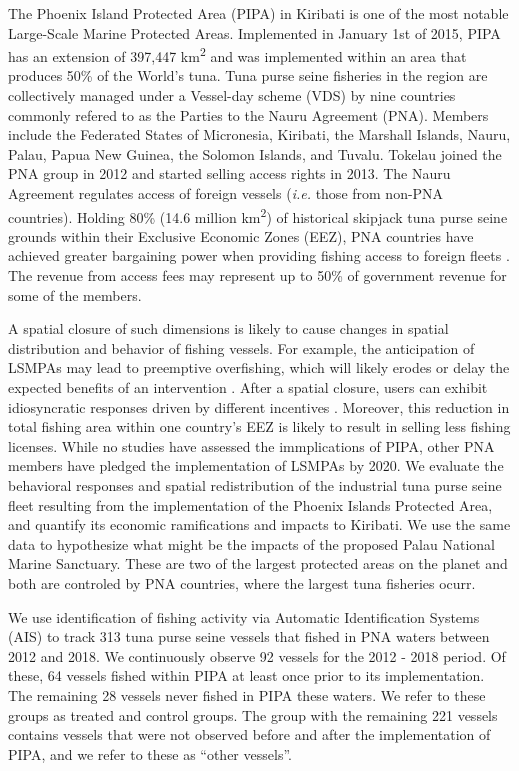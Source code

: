 \documentclass[9p,twocolumn,twoside,lineno]{pnas-new}
\begin{document}
The Phoenix Island Protected Area (PIPA) in Kiribati is one of the most notable Large-Scale Marine Protected Areas. Implemented in January 1st of 2015, PIPA has an extension of 397,447 km\textsuperscript{2} and was implemented within an area that produces 50\% of the World's tuna. Tuna purse seine fisheries in the region are collectively managed under a Vessel-day scheme (VDS) by nine countries commonly refered to as the Parties to the Nauru Agreement (PNA). Members include the Federated States of Micronesia, Kiribati, the Marshall Islands, Nauru, Palau, Papua New Guinea, the Solomon Islands, and Tuvalu. Tokelau joined the PNA group in 2012 and started selling access rights in 2013. The Nauru Agreement regulates access of foreign vessels (\emph{i.e.} those from non-PNA countries). Holding 80\% (14.6 million km\textsuperscript{2}) of historical skipjack tuna purse seine grounds within their Exclusive Economic Zones (EEZ), PNA countries have achieved greater bargaining power when providing fishing access to foreign fleets \cite{havice_2010}. The revenue from access fees may represent up to 50\% of government revenue for some of the members.

A spatial closure of such dimensions is likely to cause changes in spatial distribution and behavior of fishing vessels. For example, the anticipation of LSMPAs may lead to preemptive overfishing, which will likely erodes or delay the expected benefits of an intervention \cite{mcdermott_2018}. After a spatial closure, users can exhibit idiosyncratic responses driven by different incentives \cite{cabral_2017}. Moreover, this reduction in total fishing area within one country's EEZ is likely to result in selling less fishing licenses. While no studies have assessed the immplications of PIPA, other PNA members have pledged the implementation of LSMPAs by 2020. We evaluate the behavioral responses and spatial redistribution of the industrial tuna purse seine fleet resulting from the implementation of the Phoenix Islands Protected Area, and quantify its economic ramifications and impacts to Kiribati. We use the same data to hypothesize what might be the impacts of the proposed Palau National Marine Sanctuary. These are two of the largest protected areas on the planet and both are controled by PNA countries, where the largest tuna fisheries ocurr.

We use identification of fishing activity via Automatic Identification Systems (AIS) to track 313 tuna purse seine vessels that fished in PNA waters between 2012 and 2018. We continuously observe 92 vessels for the 2012 - 2018 period. Of these, 64 vessels fished within PIPA at least once prior to its implementation. The remaining 28 vessels never fished in PIPA these waters. We refer to these groups as treated and control groups. The group with the remaining 221 vessels contains vessels that were not observed before and after the implementation of PIPA, and we refer to these as ``other vessels''.
\end{document}
